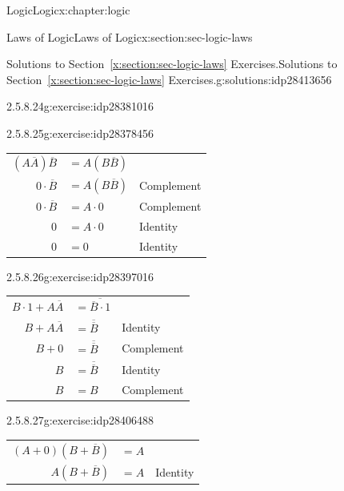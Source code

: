 \documentclass[twoside,10pt,]{book}
\newcommand{\tabularfont}{\relax}
\newcommand{\xreffont}{\relax}
\numberwithin{equation}{section}
\begin{document}
\begin{chapterptx}{Logic}{}{Logic}{}{}{x:chapter:logic}
\begin{sectionptx}{Laws of Logic}{}{Laws of Logic}{}{}{x:section:sec-logic-laws}
\begin{solutions-subsection}{Solutions to Section~{\xreffont\ref*{x:section:sec-logic-laws}} Exercises.}{}{Solutions to Section~{\xreffont\ref*{x:section:sec-logic-laws}} Exercises.}{}{}{g:solutions:idp28413656}
\begin{exercisegroup}
\begin{divisionsolutioneg}{2.5.8.24}{}{g:exercise:idp28381016}
\begin{center}
{}%
\end{center}%
\end{divisionsolutioneg}%
\end{exercisegroup}
\par\medskip\noindent
\begin{exercisegroup}
\begin{divisionsolutioneg}{2.5.8.25}{}{g:exercise:idp28378456}%
\par\smallskip%
\noindent\hypertarget{g:solution:idp28385752-main}{}\begin{center}%
{\tabularfont%
\begin{tabular}{lll}
\multicolumn{1}{r}{\((A\overline{A})\overline{B}\)}&\(=A(B\overline{B})\)&\tabularnewline[0pt]
\multicolumn{1}{r}{\(0\cdot\overline{B}\)}&\(=A(B\overline{B})\)&Complement\tabularnewline[0pt]
\multicolumn{1}{r}{\(0\cdot\overline{B}\)}&\(=A\cdot 0\)&Complement\tabularnewline[0pt]
\multicolumn{1}{r}{\(0\)}&\(=A\cdot 0\)&Identity\tabularnewline[0pt]
\multicolumn{1}{r}{\(0\)}&\(=0\)&Identity
\end{tabular}
}%
\end{center}%
\end{divisionsolutioneg}%
\begin{divisionsolutioneg}{2.5.8.26}{}{g:exercise:idp28397016}%
\par\smallskip%
\noindent\hypertarget{g:solution:idp28392792-main}{}\begin{center}%
{\tabularfont%
\begin{tabular}{lll}
\multicolumn{1}{r}{\(B\cdot 1+A\overline{A}\)}&\(=\overline{\overline{B}\cdot 1}\)&\tabularnewline[0pt]
\multicolumn{1}{r}{\(B+A\overline{A}\)}&\(=\overline{\overline{B}}\)&Identity\tabularnewline[0pt]
\multicolumn{1}{r}{\(B+0\)}&\(=\overline{\overline{B}}\)&Complement\tabularnewline[0pt]
\multicolumn{1}{r}{\(B\)}&\(=\overline{\overline{B}}\)&Identity\tabularnewline[0pt]
\multicolumn{1}{r}{\(B\)}&\(=B\)&Complement
\end{tabular}
}%
\end{center}%
\end{divisionsolutioneg}%
\begin{divisionsolutioneg}{2.5.8.27}{}{g:exercise:idp28406488}%
\par\smallskip%
\noindent\hypertarget{g:solution:idp28401496-main}{}\begin{center}%
{\tabularfont%
\begin{tabular}{lll}
\multicolumn{1}{r}{\((A+0)(B+\overline{B})\)}&\(=A\)&\tabularnewline[0pt]
\multicolumn{1}{r}{\(A(B+\overline{B})\)}&\(=A\)&Identity\tabularnewline[0pt]

\end{tabular}}
\end{center}
\end{divisionsolutioneg}
\end{exercisegroup}
\end{solutions-subsection}
\end{sectionptx}
\end{chapterptx}
\end{document}
